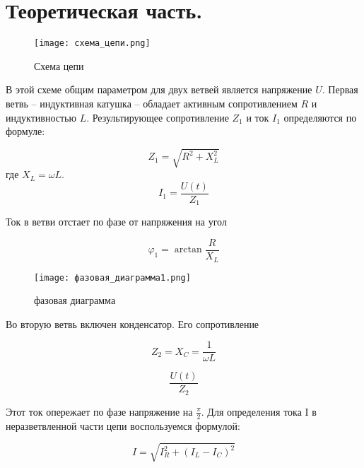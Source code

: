     \section*{Теоретическая часть.}

    \begin{figure}[h!]
        \centering
        \texttt{[image: схема\_цепи.png]}
        \caption{Схема цепи}
    \end{figure}

    \noindent В этой схеме общим параметром для двух ветвей является напряжение $U$. 
    Первая ветвь -- индуктивная катушка -- обладает активным сопротивлением $R$ и индуктивностью $L$. 
    Результирующее сопротивление $Z_1$ и ток $I_1$ определяются по формуле:

    \begin{equation*}
        Z_1 = \sqrt{R^2 + X_L^2}
    \end{equation*}
    где $X_L = \omega L$.
    \begin{equation*}
        I_1 = \frac{U(t)}{Z_1}
    \end{equation*}

    \noindent Ток в ветви отстает по фазе от напряжения на угол

    \begin{equation*}
        \varphi_1 = \arctan \frac{R}{X_L}
    \end{equation*}

    \begin{figure}[h!]
        \centering
        \texttt{[image: фазовая\_диаграмма1.png]}
        \caption{фазовая диаграмма}
    \end{figure}

    \noindent Во вторую ветвь включен конденсатор. Его сопротивление

    \begin{equation*}
        Z_2 = X_C = \frac{1}{\omega L}
    \end{equation*}

    \begin{equation*}
        \frac{U(t)}{Z_2}
    \end{equation*}

    \noindent Этот ток опережает по фазе напряжение на $\frac{\pi}{2}$.
    Для определения тока I в неразветвленной части цепи воспользуемся формулой:

    \begin{equation*}
        I = \sqrt{I_R^2 + (I_L - I_C)^2}
    \end{equation*}

